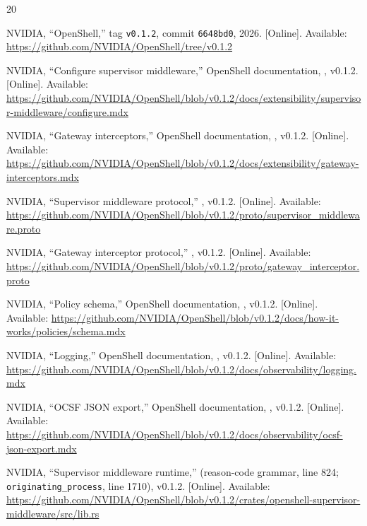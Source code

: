 \documentclass[journal]{IEEEtran}
\begin{document}
\sloppy
\begin{thebibliography}{20}

NVIDIA, ``OpenShell,'' tag \texttt{v0.1.2}, commit \texttt{6648bd0}, 2026. [Online]. Available: \url{https://github.com/NVIDIA/OpenShell/tree/v0.1.2}

NVIDIA, ``Configure supervisor middleware,'' OpenShell documentation, , v0.1.2. [Online]. Available: \url{https://github.com/NVIDIA/OpenShell/blob/v0.1.2/docs/extensibility/supervisor-middleware/configure.mdx}

NVIDIA, ``Gateway interceptors,'' OpenShell documentation, , v0.1.2. [Online]. Available: \url{https://github.com/NVIDIA/OpenShell/blob/v0.1.2/docs/extensibility/gateway-interceptors.mdx}

NVIDIA, ``Supervisor middleware protocol,'' , v0.1.2. [Online]. Available: \url{https://github.com/NVIDIA/OpenShell/blob/v0.1.2/proto/supervisor_middleware.proto}

NVIDIA, ``Gateway interceptor protocol,'' , v0.1.2. [Online]. Available: \url{https://github.com/NVIDIA/OpenShell/blob/v0.1.2/proto/gateway_interceptor.proto}

NVIDIA, ``Policy schema,'' OpenShell documentation, , v0.1.2. [Online]. Available: \url{https://github.com/NVIDIA/OpenShell/blob/v0.1.2/docs/how-it-works/policies/schema.mdx}

NVIDIA, ``Logging,'' OpenShell documentation, , v0.1.2. [Online]. Available: \url{https://github.com/NVIDIA/OpenShell/blob/v0.1.2/docs/observability/logging.mdx}

NVIDIA, ``OCSF JSON export,'' OpenShell documentation, , v0.1.2. [Online]. Available: \url{https://github.com/NVIDIA/OpenShell/blob/v0.1.2/docs/observability/ocsf-json-export.mdx}

NVIDIA, ``Supervisor middleware runtime,''  (reason-code grammar, line 824; \texttt{originating\_process}, line 1710), v0.1.2. [Online]. Available: \url{https://github.com/NVIDIA/OpenShell/blob/v0.1.2/crates/openshell-supervisor-middleware/src/lib.rs}


\end{thebibliography}
\end{document}
